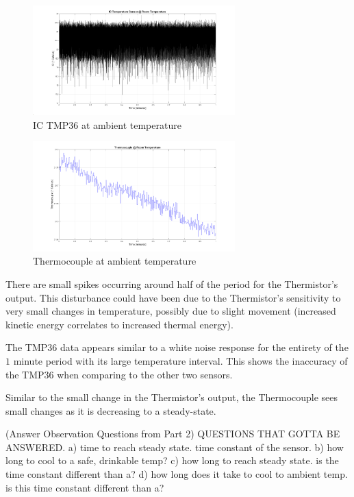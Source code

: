 \documentclass{article}
\begin{document}
    \begin{figure}[H]
        \centering
        \includegraphics[width=0.695\textwidth]{lab2images/ICTMP36_roomtemp_1min_plot.png}
        \caption{IC TMP36 at ambient temperature}
    \end{figure}
    
    \begin{figure}[H]
        \centering
        \includegraphics[width=0.695\textwidth]{lab2images/thermocouple_roomtemp_1min_plot.png}
        \caption{Thermocouple at ambient temperature}
    \end{figure}


    
    There are small spikes occurring around half of the period for the Thermistor's output. This disturbance could have been due to the Thermistor's sensitivity to very small changes in temperature, possibly due to slight movement (increased kinetic energy correlates to increased thermal energy).
    
    The TMP36 data appears similar to a white noise response for the entirety of the $1$ minute period with its large temperature interval. This shows the inaccuracy of the TMP36 when comparing to the other two sensors.
    
    Similar to the small change in the Thermistor's output, the Thermocouple sees small changes as it is decreasing to a steady-state. 

(Answer Observation Questions from Part 2)
QUESTIONS THAT GOTTA BE ANSWERED.
    a) time to reach steady state.  time constant of the sensor.  
    b) how long to cool to a safe, drinkable temp?
    c) how long to reach steady state.  is the time constant different than a?
    d) how long does it take to cool to ambient temp.  is this time constant different than a? 
\end{document}
